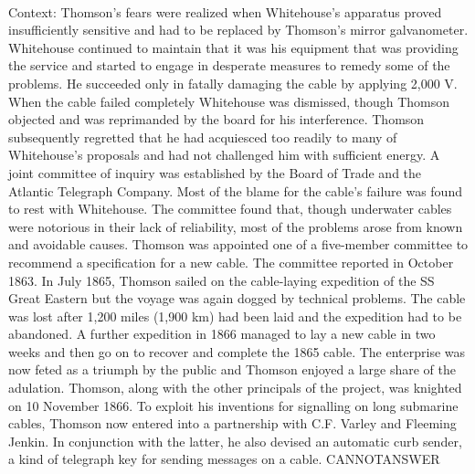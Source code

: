\documentclass[11pt,a4paper, onecolumn]{article}
\begin{document}
\\ Context: Thomson's fears were realized when Whitehouse's apparatus proved insufficiently sensitive and had to be replaced by Thomson's mirror galvanometer. Whitehouse continued to maintain that it was his equipment that was providing the service and started to engage in desperate measures to remedy some of the problems. He succeeded only in fatally damaging the cable by applying 2,000 V. When the cable failed completely Whitehouse was dismissed, though Thomson objected and was reprimanded by the board for his interference. Thomson subsequently regretted that he had acquiesced too readily to many of Whitehouse's proposals and had not challenged him with sufficient energy. A joint committee of inquiry was established by the Board of Trade and the Atlantic Telegraph Company. Most of the blame for the cable's failure was found to rest with Whitehouse. The committee found that, though underwater cables were notorious in their lack of reliability, most of the problems arose from known and avoidable causes. Thomson was appointed one of a five-member committee to recommend a specification for a new cable. The committee reported in October 1863. In July 1865, Thomson sailed on the cable-laying expedition of the SS Great Eastern but the voyage was again dogged by technical problems. The cable was lost after 1,200 miles (1,900 km) had been laid and the expedition had to be abandoned. A further expedition in 1866 managed to lay a new cable in two weeks and then go on to recover and complete the 1865 cable. The enterprise was now feted as a triumph by the public and Thomson enjoyed a large share of the adulation. Thomson, along with the other principals of the project, was knighted on 10 November 1866. To exploit his inventions for signalling on long submarine cables, Thomson now entered into a partnership with C.F. Varley and Fleeming Jenkin. In conjunction with the latter, he also devised an automatic curb sender, a kind of telegraph key for sending messages on a cable. CANNOTANSWER
\end{document}
